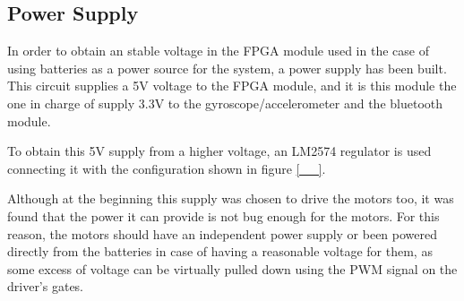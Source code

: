 
\subsection{Power Supply}
In order to obtain an stable voltage in the FPGA module used in the case of using batteries as a power source for the system, a power supply has been built.
This circuit supplies a 5V voltage to the FPGA module, and it is this module the one in charge of supply 3.3V to the gyroscope/accelerometer and the bluetooth module.

To obtain this 5V supply from a higher voltage, an LM2574 regulator is used connecting it with the configuration shown in figure \ref{__}.

Although at the beginning this supply was chosen to drive the motors too, it was found that the power it can provide is not bug enough for the motors.
For this reason, the motors should have an independent power supply or been powered directly from the batteries in case of having a reasonable voltage for them, as some excess of voltage can be virtually pulled down using the PWM signal on the driver's gates.
